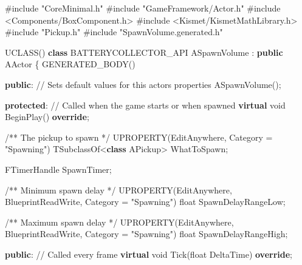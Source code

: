 \documentclass[
  letterpaper,
  DIV=11,
  numbers=noendperiod]{scrartcl}
\newenvironment{Shaded}{\begin{snugshade}}{\end{snugshade}}
\newcommand{\CommentTok}[1]{\textcolor[rgb]{0.37,0.37,0.37}{#1}}
\newcommand{\DataTypeTok}[1]{\textcolor[rgb]{0.68,0.00,0.00}{#1}}
\newcommand{\ImportTok}[1]{\textcolor[rgb]{0.00,0.46,0.62}{#1}}
\newcommand{\KeywordTok}[1]{\textcolor[rgb]{0.00,0.23,0.31}{\textbf{#1}}}
\newcommand{\NormalTok}[1]{\textcolor[rgb]{0.00,0.23,0.31}{#1}}
\newcommand{\OperatorTok}[1]{\textcolor[rgb]{0.37,0.37,0.37}{#1}}
\newcommand{\PreprocessorTok}[1]{\textcolor[rgb]{0.68,0.00,0.00}{#1}}
\newcommand{\StringTok}[1]{\textcolor[rgb]{0.13,0.47,0.30}{#1}}
\begin{document}
\begin{Shaded}
\begin{Highlighting}[]
\PreprocessorTok{\#include }\ImportTok{"CoreMinimal.h"}
\PreprocessorTok{\#include }\ImportTok{"GameFramework/Actor.h"}
\PreprocessorTok{\#include }\ImportTok{\textless{}Components/BoxComponent.h\textgreater{}}
\PreprocessorTok{\#include }\ImportTok{\textless{}Kismet/KismetMathLibrary.h\textgreater{}}
\PreprocessorTok{\#include }\ImportTok{"Pickup.h"}
\PreprocessorTok{\#include }\ImportTok{"SpawnVolume.generated.h"}

\NormalTok{UCLASS}\OperatorTok{()}
\KeywordTok{class}\NormalTok{ BATTERYCOLLECTOR\_API ASpawnVolume }\OperatorTok{:} \KeywordTok{public}\NormalTok{ AActor}
\OperatorTok{\{}
\NormalTok{    GENERATED\_BODY}\OperatorTok{()}
    
\KeywordTok{public}\OperatorTok{:}    
    \CommentTok{// Sets default values for this actor\textquotesingle{}s properties}
\NormalTok{    ASpawnVolume}\OperatorTok{();}

\KeywordTok{protected}\OperatorTok{:}
    \CommentTok{// Called when the game starts or when spawned}
    \KeywordTok{virtual} \DataTypeTok{void}\NormalTok{ BeginPlay}\OperatorTok{()} \KeywordTok{override}\OperatorTok{;}
    
    \CommentTok{/** The pickup to spawn */}
\NormalTok{    UPROPERTY}\OperatorTok{(}\NormalTok{EditAnywhere}\OperatorTok{,}\NormalTok{ Category }\OperatorTok{=} \StringTok{"Spawning"}\OperatorTok{)}
\NormalTok{    TSubclassOf}\OperatorTok{\textless{}}\KeywordTok{class}\NormalTok{ APickup}\OperatorTok{\textgreater{}}\NormalTok{ WhatToSpawn}\OperatorTok{;}
    
\NormalTok{    FTimerHandle SpawnTimer}\OperatorTok{;}
    
    \CommentTok{/** Minimum spawn delay */}
\NormalTok{    UPROPERTY}\OperatorTok{(}\NormalTok{EditAnywhere}\OperatorTok{,}\NormalTok{ BlueprintReadWrite}\OperatorTok{,}\NormalTok{ Category }\OperatorTok{=} \StringTok{"Spawning"}\OperatorTok{)}
    \DataTypeTok{float}\NormalTok{ SpawnDelayRangeLow}\OperatorTok{;}
    
    \CommentTok{/** Maximum spawn delay */}
\NormalTok{    UPROPERTY}\OperatorTok{(}\NormalTok{EditAnywhere}\OperatorTok{,}\NormalTok{ BlueprintReadWrite}\OperatorTok{,}\NormalTok{ Category }\OperatorTok{=} \StringTok{"Spawning"}\OperatorTok{)}
    \DataTypeTok{float}\NormalTok{ SpawnDelayRangeHigh}\OperatorTok{;}

\KeywordTok{public}\OperatorTok{:}    
    \CommentTok{// Called every frame}
    \KeywordTok{virtual} \DataTypeTok{void}\NormalTok{ Tick}\OperatorTok{(}\DataTypeTok{float}\NormalTok{ DeltaTime}\OperatorTok{)} \KeywordTok{override}\OperatorTok{;}
    

\end{Highlighting}
\end{Shaded}
\end{document}
